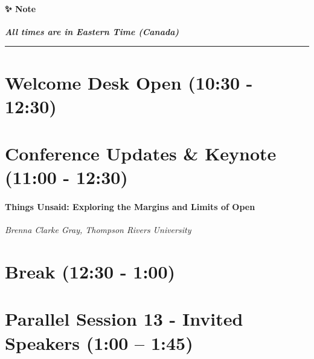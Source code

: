 \documentclass[
]{book}
\begin{document}
\begin{protip}
\hypertarget{note}{%
\paragraph*{✨ Note}\label{note}}

\textbf{\emph{All times are in Eastern Time (Canada)}}
\end{protip}

\begin{center}\rule{0.5\linewidth}{0.5pt}\end{center}

\hypertarget{welcome-desk-open-1030---1230-3}{%
\section*{Welcome Desk Open (10:30 - 12:30)}\label{welcome-desk-open-1030---1230-3}}

\hypertarget{conference-updates-keynote-1100---1230-2}{%
\section*{Conference Updates \& Keynote (11:00 - 12:30)}\label{conference-updates-keynote-1100---1230-2}}

\begin{reflect}
\hypertarget{things-unsaid-exploring-the-margins-and-limits-of-open}{%
\paragraph{Things Unsaid: Exploring the Margins and Limits of
Open}\label{things-unsaid-exploring-the-margins-and-limits-of-open}}

\emph{Brenna Clarke Gray, Thompson Rivers University}
\end{reflect}

\hypertarget{break-1230---100-3}{%
\section*{Break (12:30 - 1:00)}\label{break-1230---100-3}}

\hypertarget{parallel-session-13---invited-speakers-100-145}{%
\section*{Parallel Session 13 - Invited Speakers (1:00 -- 1:45)}\label{parallel-session-13---invited-speakers-100-145}}
\end{document}
